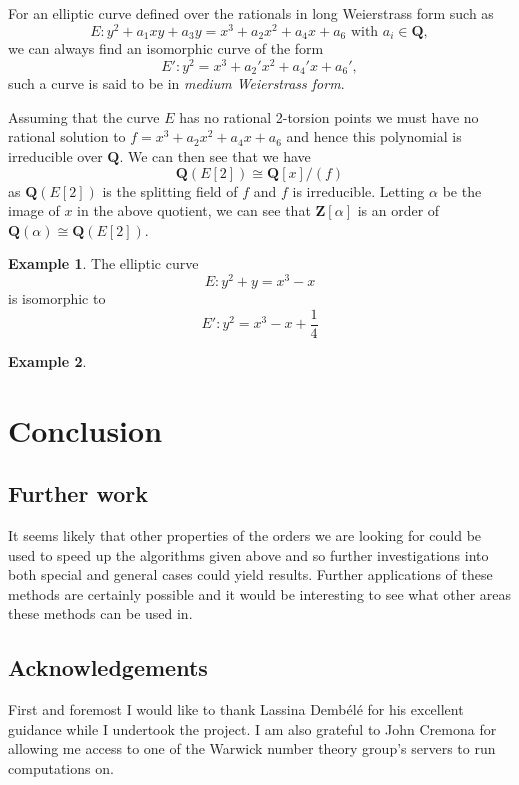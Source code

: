 \documentclass[12pt,a4paper,abstracton,bibtotoc]{scrreprt}
\theoremstyle{definition}
\newtheorem{ex}{Example}
\newcommand{\QQ}{\mathbf{Q}}
\newcommand{\ZZ}{\mathbf{Z}}
\begin{document}
For an elliptic curve defined over the rationals in long Weierstrass form such as
\[
E \colon y^2 + a_1xy + a_3y = x^3 + a_2x^2 + a_4x + a_6\text{ with }a_i \in \QQ,
\]
we can always find an isomorphic curve of the form
\[
E' \colon y^2 = x^3 + a_2'x^2 + a_4'x + a_6',
\]
such a curve is said to be in \emph{medium Weierstrass form}.

\minisec{}
Assuming that the curve $E$ has no rational 2-torsion points we must have no rational solution to $f = x^3 + a_2x^2 + a_4x + a_6$ and hence this polynomial is irreducible over $\QQ$.
We can then see that we have
\[
\QQ(E[2]) \cong \QQ[x]/(f)
\]
as $\QQ(E[2])$ is the splitting field of $f$ and $f$ is irreducible. %
Letting $\alpha$ be the image of $x$ in the above quotient, we can see that $ \ZZ[\alpha]$ is an order of $\QQ(\alpha)\cong \QQ(E[2])$.

\begin{ex}
The elliptic curve
\[
E\colon y^2 + y = x^3 - x
\]
is isomorphic to
\[
E'\colon y^2 = x^3 - x + \frac{1}{4}
\]
\end{ex}

\begin{ex}
\end{ex}

\chapter{Conclusion}

\section{Further work}
It seems likely that other properties of the orders we are looking for could be used to speed up the algorithms given above and so further investigations into both special and general cases could yield results.
Further applications of these methods are certainly possible and it would be interesting to see what other areas these methods can be used in. %


\section{Acknowledgements}
First and foremost I would like to thank Lassina Demb\'el\'e for his excellent guidance while I undertook the project.
I am also grateful to John Cremona for allowing me access to one of the Warwick number theory group's servers to run computations on.
\end{document}

